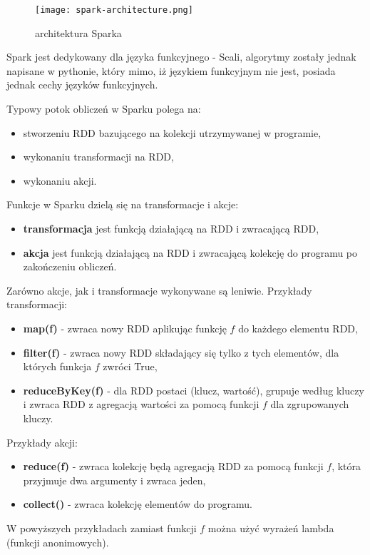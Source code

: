 \documentclass[magisterska]{pracamgr}
\theoremstyle{plain}
\theoremstyle{definition}
\theoremstyle{remark}
\begin{document}
\begin{figure}
 \caption{architektura Sparka}
 \texttt{[image: spark-architecture.png]}
\end{figure}

Spark jest dedykowany dla języka funkcyjnego - Scali, algorytmy zostały jednak napisane w pythonie, który 
mimo, iż językiem funkcyjnym nie jest, posiada jednak cechy języków funkcyjnych. 

Typowy potok obliczeń w Sparku polega na:
\begin{itemize}
 \item stworzeniu RDD bazującego na kolekcji utrzymywanej w programie,
 \item wykonaniu transformacji na RDD,
 \item wykonaniu akcji.
\end{itemize}

Funkcje w Sparku dzielą się na transformacje i akcje:
\begin{itemize}
 \item \textbf{transformacja} jest funkcją działającą na RDD i zwracającą RDD,
 \item \textbf{akcja} jest funkcją działającą na RDD i zwracającą kolekcję do programu po zakończeniu obliczeń.
\end{itemize}
Zarówno akcje, jak i transformacje wykonywane są leniwie. Przykłady transformacji:
\begin{itemize}
 \item \textbf{map(f)} - zwraca nowy RDD aplikując funkcję $f$ do każdego elementu RDD,
 \item \textbf{filter(f)} - zwraca nowy RDD składający się tylko z tych elementów, dla których funkcja $f$ zwróci True,
 \item \textbf{reduceByKey(f)}\label{reduceByKey} - dla RDD postaci (klucz, wartość), grupuje według kluczy i zwraca RDD z agregacją wartości 
 za pomocą funkcji $f$ dla zgrupowanych kluczy.
\end{itemize}

Przykłady akcji:
\begin{itemize}
 \item \textbf{reduce(f)} - zwraca kolekcję będą agregacją RDD za pomocą funkcji $f$, która przyjmuje dwa 
 argumenty i zwraca jeden,
 \item \textbf{collect()} - zwraca kolekcję elementów do programu.
\end{itemize}

W powyższych przykładach zamiast funkcji $f$ można użyć wyrażeń lambda (funkcji anonimowych).
\end{document}
